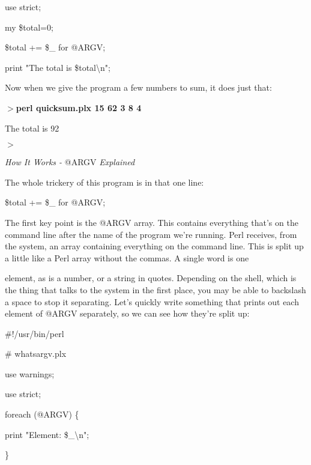 \documentclass[a4paper,11pt]{book}
\begin{document}
\noindent use strict;

\noindent 

\noindent my \$total=0;

\noindent \$total += \$\_  for @ARGV;

\noindent print "The total is \$total\textbackslash n";

\noindent 

\noindent Now when we give the program a few numbers to sum, it does just that:

\noindent 

\noindent $>$\textbf{perl quicksum.plx 15 62 3 8 4 }

\noindent The total is 92

\noindent $>$

\noindent 

\noindent \textit{How It Works - }@ARGV\textit{ Explained}

\noindent The whole trickery of this program is in that one line:

\noindent 

\noindent \$total += \$\_  for @ARGV;

\noindent 

\noindent The first key point is the @ARGV array. This contains everything that's on the command line after the name of the program we're running. Perl receives, from the system, an array containing everything on the command line. This is split up a little like a Perl array without the commas. A single word is one

\noindent element, as is a number, or a string in quotes. Depending on the shell, which is the thing that talks to the system in the first place, you may be able to backslash a space to stop it separating. Let's quickly write something that prints out each element of @ARGV separately, so we can see how they're split up:

\noindent 

\noindent \#!/usr/bin/perl

\noindent \# whatsargv.plx

\noindent use warnings;

\noindent use strict;

\noindent 

\noindent foreach (@ARGV) \{

\noindent print "Element: \textbar \$\_\textbar \textbackslash n";

\noindent \}

\noindent 
\end{document}
